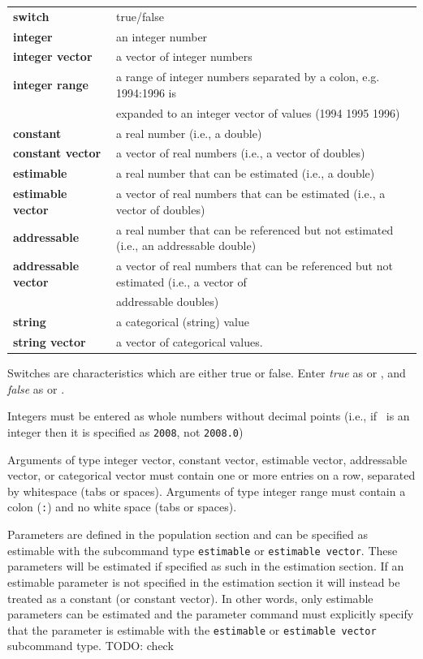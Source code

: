\begin{tabular}{ll}
\textbf{switch} & true/false \\
\textbf{integer}& an integer number \\
\textbf{integer vector} & a vector of integer numbers \\
\textbf{integer range} & a range of integer numbers separated by a colon, e.g. 1994:1996 is \\ & expanded to an integer vector of values (1994 1995 1996) \\
\textbf{constant} & a real number (i.e., a double) \\
\textbf{constant vector} & a vector of real numbers (i.e., a vector of doubles) \\
\textbf{estimable} & a real number that can be estimated (i.e., a double) \\
\textbf{estimable vector} & a vector of real numbers that can be estimated (i.e., a vector of doubles) \\
\textbf{addressable} & a real number that can be referenced but not estimated (i.e., an addressable double) \\
\textbf{addressable vector} & a vector of real numbers that can be referenced but not estimated (i.e., a vector of \\ & addressable doubles) \\
\textbf{string} & a categorical (string) value \\
\textbf{string vector} & a vector of categorical values.
\end{tabular}

Switches are characteristics which are either true or false. Enter \emph{true} as  or , and \emph{false} as  or .

Integers must be entered as whole numbers without decimal points (i.e., if \ is an integer then it is specified as \texttt{2008}, not \texttt{2008.0})

Arguments of type integer vector, constant vector, estimable vector, addressable vector, or categorical vector must contain one or more entries on a row, separated by whitespace (tabs or spaces). Arguments of type integer range must contain a colon (\texttt{:}) and no white space (tabs or spaces).

Parameters are defined in the population section and can be specified as estimable with the subcommand type \texttt{estimable} or \texttt{estimable vector}. These parameters will be estimated if specified as such in the estimation section. If an estimable parameter is not specified in the estimation section it will instead be treated as a constant (or constant vector). In other words, only estimable parameters can be estimated and the parameter command must explicitly specify that the parameter is estimable with the \texttt{estimable} or \texttt{estimable vector} subcommand type. TODO: check

